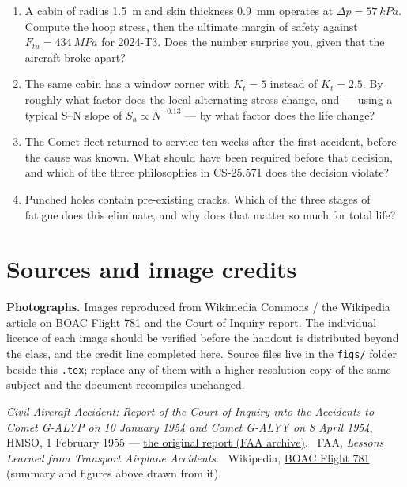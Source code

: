 \documentclass[11pt,a4paper]{article}
\begin{document}
\begin{enumerate}[nosep]
  \item A cabin of radius \SI{1.5}{m} and skin thickness \SI{0.9}{mm} operates at $\Delta p=\SI{57}{kPa}$. Compute the hoop stress, then the ultimate margin of safety against $F_{tu}=\SI{434}{MPa}$ for 2024-T3. Does the number surprise you, given that the aircraft broke apart?
  \item The same cabin has a window corner with $K_t=5$ instead of $K_t=2.5$. By roughly what factor does the local alternating stress change, and --- using a typical S--N slope of $S_a\propto N^{-0.13}$ --- by what factor does the life change?
  \item The Comet fleet returned to service ten weeks after the first accident, before the cause was known. What should have been required before that decision, and which of the three philosophies in CS-25.571 does the decision violate?
  \item Punched holes contain pre-existing cracks. Which of the three stages of fatigue does this eliminate, and why does that matter so much for total life?
\end{enumerate}

\section*{Sources and image credits}
\footnotesize
\textbf{Photographs.} Images reproduced from Wikimedia Commons / the Wikipedia article on BOAC Flight 781 and the Court of Inquiry report. The individual licence of each image should be verified before the handout is distributed beyond the class, and the credit line completed here. Source files live in the \texttt{figs/} folder beside this \texttt{.tex}; replace any of them with a higher-resolution copy of the same subject and the document recompiles unchanged.

\medskip
\emph{Civil Aircraft Accident: Report of the Court of Inquiry into the Accidents to Comet G-ALYP on 10 January 1954 and Comet G-ALYY on 8 April 1954}, HMSO, 1 February 1955 --- \href{https://www.faa.gov/sites/faa.gov/files/2022-10/G-ALYP_Report_0.pdf}{the original report (FAA archive)}. \ FAA, \emph{Lessons Learned from Transport Airplane Accidents}. \ Wikipedia, \href{https://en.wikipedia.org/wiki/BOAC_Flight_781}{BOAC Flight 781} (summary and figures above drawn from it).
\end{document}
